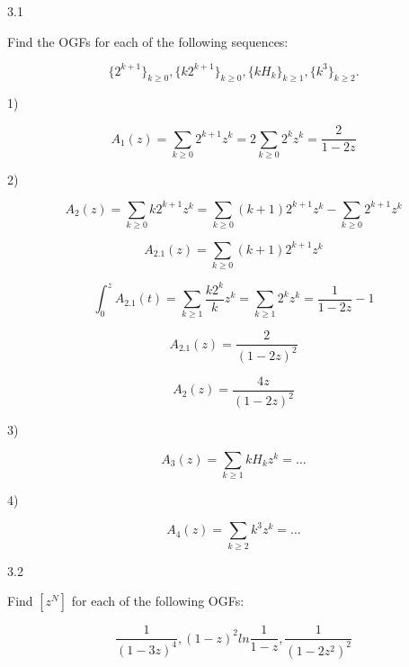 \documentclass[12pt]{article}
\begin{document}
3.1

Find the OGFs for each of the following sequences:

\begin{equation}
\{ 2^{k+1}\}_{k \geq 0}, \{k2^{k+1} \}_{k \geq 0}, \{kH_{k}\}_{k \geq 1}, \{k^3\}_{k \geq 2}. \nonumber
\end{equation}


1)

\begin{equation}
A_{1}(z) = \sum_{k \geq 0}2^{k+1}z^k = 2\sum_{k \geq 0}2^kz^k = \frac{2}{1-2z} \nonumber
\end{equation}

2)

\begin{equation}
A_{2}(z) = \sum_{k \geq 0}k2^{k+1}z^k  = \sum_{k \geq 0}(k+1)2^{k+1}z^k - \sum_{k \geq 0}2^{k+1}z^k \nonumber
\end{equation}

\begin{equation}
A_{2.1}(z) = \sum_{k \geq 0}(k + 1)2^{k+1}z^k \nonumber
\end{equation}

\begin{equation}
\int_0^z A_{2.1}(t) = \sum_{k \geq 1}\frac{k2^k}{k}z^k = \sum_{k \geq 1} 2^kz^k = \frac{1}{1-2z} - 1\nonumber
\end{equation}

\begin{equation}
A_{2.1}(z) = \frac{2}{(1-2z)^2} \nonumber
\end{equation}

\begin{equation}
A_{2}(z) = \frac{4z}{(1 - 2z)^2} \nonumber
\end{equation}

3)

\begin{equation}
A_{3}(z) = \sum_{k \geq 1} kH_kz^k =  \dots \nonumber
\end{equation}

4)

\begin{equation}
A_{4}(z) = \sum_{k \geq 2}{k^3z^k} = \dots \nonumber
\end{equation}

3.2

Find ${[z^N]}$ for each of the following OGFs:

\begin{equation}
\frac{1}{(1 - 3z)^4}, (1 - z)^2ln\frac{1}{1 - z}, \frac{1}{(1 - 2z^2)^2} \nonumber
\end{equation}
\end{document}
